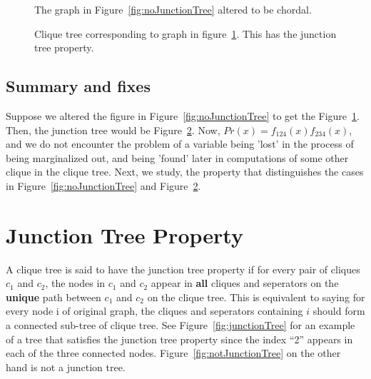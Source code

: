 \documentclass[12pt]{report}
\begin{document}
\begin{figure}
\centering
{}
\caption{The graph in Figure~\ref{fig:noJunctionTree} altered to be chordal.}
\label{fig:G3}
\end{figure}

\begin{figure}
\centering
{}
\caption{Clique tree corresponding to graph in figure~\ref{fig:G3}. This has the junction tree property.}
\label{fig:CT3}
\end{figure}


\subsection{Summary and fixes}
Suppose we altered the figure in Figure~\ref{fig:noJunctionTree} to get the Figure~\ref{fig:G3}. Then, the junction tree would be Figure~\ref{fig:CT3}. Now, $Pr(x) = f_{124}(x)f_{234}(x)$, and we do not encounter the problem of a variable being 'lost' in the process of being marginalized out, and being 'found' later in computations of some other clique in the clique tree. Next, we study, the property that distinguishes the cases in Figure~\ref{fig:noJunctionTree} and Figure~\ref{fig:CT3}.

\section{Junction Tree Property}

A clique tree is said to have the junction tree property if for every pair of cliques $c_{1}$ and $c_{2}$, the nodes in $c_{1}$ and $c_{2}$ appear in \textbf{all} cliques and seperators on the \textbf{unique} path between $c_{1}$ and $c_{2}$ on the clique tree. This is equivalent to saying for every node i of original graph, the cliques and seperators containing $i$ should form a connected sub-tree of clique tree. See Figure~\ref{fig:junctionTree} for an example of a tree that satisfies the junction tree property since the index ``2'' appears in each of the three connected nodes. Figure~\ref{fig:notJunctionTree} on the other hand is not a junction tree.
\end{document}
